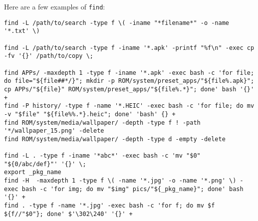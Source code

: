 Here are a few examples of \lstinline|find|:

\begin{lstlisting}
find -L /path/to/search -type f \( -iname "*filename*" -o -name '*.txt' \)

find -L /path/to/search -type f -iname '*.apk' -printf "%f\n" -exec cp -fv '{}' /path/to/copy \;

find APPs/ -maxdepth 1 -type f -iname '*.apk' -exec bash -c 'for file; do file="${file##*/}"; mkdir -p ROM/system/preset_apps/"${file%.apk}"; cp APPs/"${file}" ROM/system/preset_apps/"${file%.*}"; done' bash '{}' +
find -P history/ -type f -name '*.HEIC' -exec bash -c 'for file; do mv -v "$file" "${file%%.*}.heic"; done' 'bash' {} +
find ROM/system/media/wallpaper/ -depth -type f ! -path '*/wallpaper_15.png' -delete
find ROM/system/media/wallpaper/ -depth -type d -empty -delete

find -L . -type f -iname '*abc*' -exec bash -c 'mv "$0" "${0/abc/def}"' '{}' \;
export _pkg_name
find -H  -maxdepth 1 -type f \( -name '*.jpg' -o -name '*.png' \) -exec bash -c 'for img; do mv "$img" pics/"${_pkg_name}"; done' bash '{}' +
find . -type f -name '*.jpg' -exec bash -c 'for f; do mv $f ${f//"$0"}; done' $'\302\240' '{}' +
\end{lstlisting}

